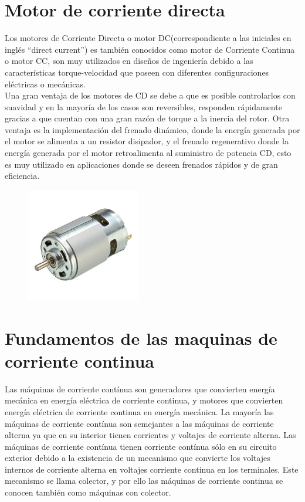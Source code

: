\documentclass[12pt,a4paper]{article}
\begin{document}
\section{Motor de corriente directa}
Los motores de Corriente Directa o motor DC(correspondiente a las iniciales en inglés “direct current”) es también conocidos como motor de Corriente Continua o motor CC, son  muy utilizados en diseños de ingeniería debido a las características torque-velocidad que poseen con diferentes configuraciones eléctricas o mecánicas.\\
Una gran ventaja de los motores de CD se debe a que es posible controlarlos con suavidad y en la mayoría de los casos son reversibles, responden rápidamente gracias a que cuentan con una gran razón de torque a la inercia del rotor. Otra ventaja es la implementación del frenado dinámico, donde la energía generada por el motor se alimenta a un resistor disipador, y el frenado regenerativo donde la energía generada por el motor retroalimenta al suministro de potencia CD, esto es muy utilizado en aplicaciones donde se deseen frenados rápidos y de gran eficiencia.
\begin{figure}[h!]
\centering
\includegraphics[width=5cm]{775-corriente-continua-12v-36v-3500-9000rpm-motor-bola-tenie-D_NQ_NP_791793-MLM31405059472_072019-Q.jpg} 
\end{figure}

\section{Fundamentos de las maquinas de corriente continua}
Las máquinas de corriente contínua son generadores que convierten energía mecánica en energía eléctrica de corriente continua, y motores que convierten energía eléctrica de corriente continua en energía mecánica. La mayoría las máquinas de corriente contínua son semejantes a las máquinas de corriente alterna ya que en su interior tienen corrientes y voltajes de corriente alterna. Las máquinas de corriente contínua tienen corriente contínua sólo en su circuito exterior debido a la existencia de un mecanismo que convierte los voltajes internos de corriente alterna en voltajes corriente continua en los terminales. Este mecanismo se llama colector, y por ello las máquinas de corriente continua se conocen también como máquinas con colector.
\newpage
\end{document}
